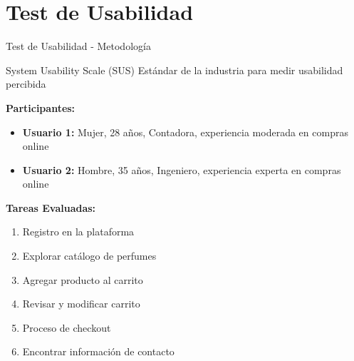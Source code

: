 \documentclass[aspectratio=169]{beamer}
\begin{document}
\section{Test de Usabilidad}

\begin{frame}{Test de Usabilidad - Metodología}
\begin{block}{System Usability Scale (SUS)}
Estándar de la industria para medir usabilidad percibida
\end{block}

\vspace{0.3cm}

\textbf{Participantes:}
\begin{itemize}
    \item \textbf{Usuario 1:} Mujer, 28 años, Contadora, experiencia moderada en compras online
    \item \textbf{Usuario 2:} Hombre, 35 años, Ingeniero, experiencia experta en compras online
\end{itemize}

\vspace{0.3cm}

\textbf{Tareas Evaluadas:}
\begin{enumerate}
    \item Registro en la plataforma
    \item Explorar catálogo de perfumes
    \item Agregar producto al carrito
    \item Revisar y modificar carrito
    \item Proceso de checkout
    \item Encontrar información de contacto
\end{enumerate}
\end{frame}
\end{document}
